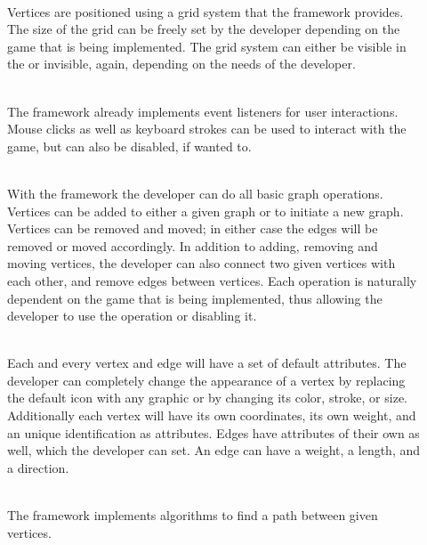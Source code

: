 \vspace{.5cm}
\begin{description}
	\item[] \textbf{} \\
	Vertices are positioned using a grid system that the framework provides. The size of the grid can be freely set by the developer depending on the game that is being implemented. The grid system can either be visible in the  or invisible, again, depending on the needs of the developer.
	\item[] \textbf{} \\
	The framework already implements event listeners for user interactions. Mouse clicks as well as keyboard strokes can be used to interact with the game, but can also be disabled, if wanted to.
  	\item[] \textbf{}   \\
	With the framework the developer can do all basic graph operations. Vertices can be added to either a given graph or to initiate a new graph. Vertices can be removed and moved; in either case the edges will be removed or moved accordingly. In addition to adding, removing and moving vertices, the developer can also connect two given vertices with each other, and remove edges between vertices. Each operation is naturally dependent on the game that is being implemented, thus allowing the developer to use the operation or disabling it.
	\item[] \textbf{}  \\
	Each and every vertex and edge will have a set of default attributes. The developer can completely change the appearance of a vertex by replacing the default icon with any graphic or by changing its color, stroke, or size. Additionally each vertex will have its own coordinates, its own weight, and an unique identification as attributes. Edges have attributes of their own as well, which the developer can set. An edge can have a weight, a length, and a direction.
	\item[] \textbf{}  \\
	The framework implements algorithms to find a path between given vertices.

\end{description}
